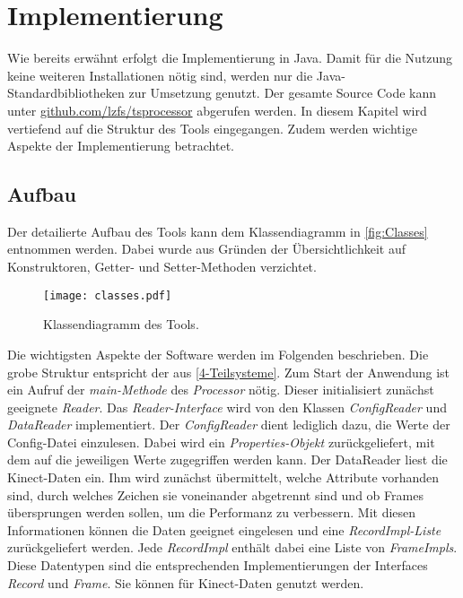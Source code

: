 \chapter{Implementierung}
\label{chapter5}
Wie bereits erwähnt erfolgt die Implementierung in Java.
Damit für die Nutzung keine weiteren Installationen nötig sind,
werden nur die Java-Standardbibliotheken zur Umsetzung genutzt.
Der gesamte Source Code kann unter \href{https://github.com/lzfs/tsprocessor}{github.com/lzfs/tsprocessor}
abgerufen werden.
In diesem Kapitel wird vertiefend auf die Struktur des Tools eingegangen.
Zudem werden wichtige Aspekte der Implementierung betrachtet.

\section{Aufbau}
\label{5-Aufbau}
Der detailierte Aufbau des Tools kann dem Klassendiagramm in \autoref{fig:Classes} entnommen werden.
Dabei wurde aus Gründen der Übersichtlichkeit auf Konstruktoren,
Getter- und Setter-Methoden verzichtet.
\begin{figure}[p]
    \begin{center}
        \texttt{[image: classes.pdf]}
    \end{center}
    \caption{Klassendiagramm des Tools.}
    \label{fig:Classes}
\end{figure}
Die wichtigsten Aspekte der Software werden im Folgenden beschrieben.
Die grobe Struktur entspricht der aus \autoref{4-Teilsysteme}.
Zum Start der Anwendung ist ein Aufruf der \emph{main-Methode} des \emph{Processor} nötig.
Dieser initialisiert zunächst geeignete \emph{Reader}.
Das \emph{Reader-Interface} wird von den Klassen \emph{ConfigReader} und \emph{DataReader} implementiert.
Der \emph{ConfigReader} dient lediglich dazu, die Werte der Config-Datei einzulesen.
Dabei wird ein \emph{Properties-Objekt} zurückgeliefert,
mit dem auf die jeweiligen Werte zugegriffen werden kann.
Der DataReader liest die Kinect-Daten ein.
Ihm wird zunächst übermittelt, welche Attribute vorhanden sind,
durch welches Zeichen sie voneinander abgetrennt sind
und ob Frames übersprungen werden sollen,
um die Performanz zu verbessern.
Mit diesen Informationen können die Daten geeignet eingelesen und eine \emph{RecordImpl-Liste} zurückgeliefert werden.
Jede \emph{RecordImpl} enthält dabei eine Liste von \emph{FrameImpls}.
Diese Datentypen sind die entsprechenden Implementierungen der Interfaces \emph{Record} und \emph{Frame}.
Sie können für Kinect-Daten genutzt werden.
